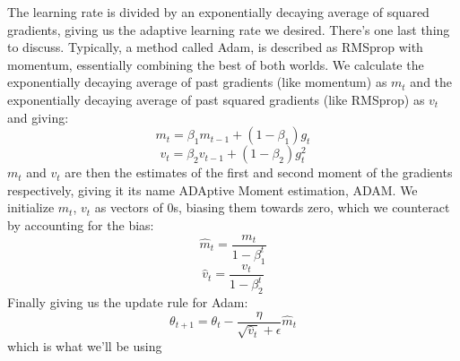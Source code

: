 \documentclass[12pt]{article}
\begin{document}
{The learning rate is divided by an exponentially decaying average of squared gradients, giving us the adaptive learning rate we desired.
\newline
There's one last thing to discuss. Typically, a method called Adam, is described as RMSprop with momentum, essentially combining the best of both worlds. We calculate the exponentially decaying average of past gradients (like momentum) as $m_t$ and the exponentially decaying average of past squared gradients (like RMSprop) as $v_t$ and giving:
\begin{equation*}
    m_t = \beta_1 m_{t-1} + (1 - \beta_1)g_t
\end{equation*}
\begin{equation*}
    v_t = \beta_2 v_{t-1} + (1 - \beta_2) g^2_t
\end{equation*}
$m_t$ and $v_t$ are then the estimates of the first and second moment of the gradients respectively, giving it its name ADAptive Moment estimation, ADAM. We initialize $m_t$, $v_t$ as vectors of 0s, biasing them towards zero, which we counteract by accounting for the bias:
\begin{equation*}
    \hat m_t = \frac{m_t}{1 - \beta_1^t}
\end{equation*}
\begin{equation*}
    \hat v_t = \frac{v_t}{1 - \beta_2^t}
\end{equation*}
Finally giving us the update rule for Adam:
\begin{equation}
    \theta_{t+1} = \theta_t - \frac{\eta}{\sqrt{\hat v_t} + \epsilon}\hat m_t
\end{equation}
which is what we'll be using
}
\end{document}
